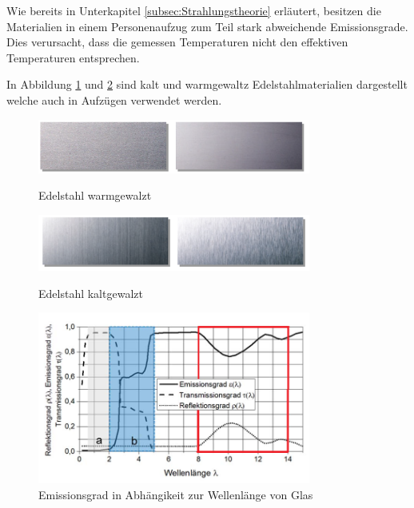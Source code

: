 Wie bereits in Unterkapitel \ref{subsec:Strahlungstheorie} erläutert, besitzen die Materialien in einem Personenaufzug zum Teil stark abweichende Emissionsgrade. Dies verursacht, dass die gemessen Temperaturen nicht den effektiven Temperaturen entsprechen. 

In Abbildung \ref{fig:Edelstahlgewalzt} und \ref{fig:Edelstahlmatt} sind kalt und warmgewaltz Edelstahlmaterialien dargestellt welche auch in Aufzügen verwendet werden.   
\begin{figure}[H]
	\centering
	\includegraphics[width=0.8\textwidth]
	{fig/Edelstahl_gewalzt.PNG}
	\caption[Edelstahl warmgewalzt]{Edelstahl warmgewalzt} \protect\cite{Edelstahl}
	\label{fig:Edelstahlgewalzt}
\end{figure}
\begin{figure}[H]
	\centering
	\includegraphics[width=0.8\textwidth]
	{fig/Edelstahl_matt.PNG}
	\caption[Edelstahl kaltgewalzt]{Edelstahl kaltgewalzt} \protect\cite{Edelstahl}
	\label{fig:Edelstahlmatt}	
\end{figure}




\begin{figure}[H]
	\centering
	\includegraphics[width=0.8\textwidth]
	{fig/Glas_bearbeitet.png}
	\caption[Emissionsgrad in Abhängikeit zur Wellenlnge]{Emissionsgrad in Abhängikeit zur Wellenlänge von Glas} 
	\label{fig:Glas}	
\end{figure}

